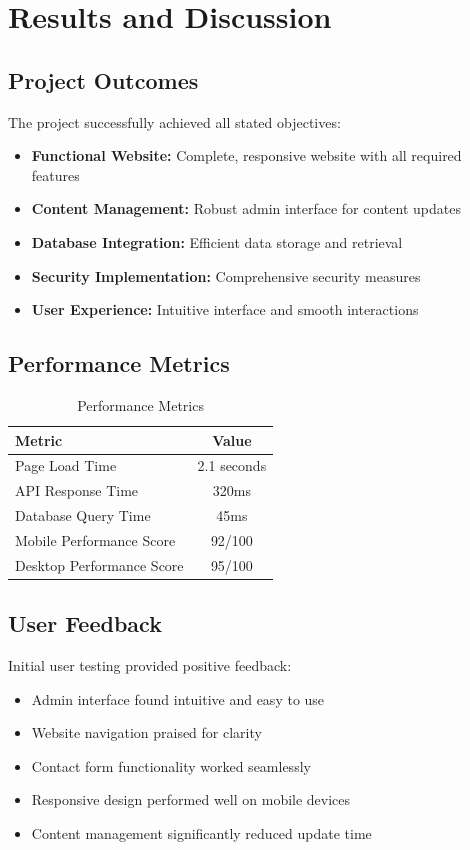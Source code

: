 \documentclass[12pt,a4paper]{report}
\begin{document}
\chapter{Results and Discussion}
\label{chap:results}

\section{Project Outcomes}
The project successfully achieved all stated objectives:
\begin{itemize}
    \item \textbf{Functional Website:} Complete, responsive website with all required features
    \item \textbf{Content Management:} Robust admin interface for content updates
    \item \textbf{Database Integration:} Efficient data storage and retrieval
    \item \textbf{Security Implementation:} Comprehensive security measures
    \item \textbf{User Experience:} Intuitive interface and smooth interactions
\end{itemize}

\section{Performance Metrics}
\begin{table}[h]
    \centering
    \begin{tabular}{|l|c|}
        \hline
        \textbf{Metric} & \textbf{Value} \\
        \hline
        Page Load Time & 2.1 seconds \\
        API Response Time & 320ms \\
        Database Query Time & 45ms \\
        Mobile Performance Score & 92/100 \\
        Desktop Performance Score & 95/100 \\
        \hline
    \end{tabular}
    \caption{Performance Metrics}
    \label{tab:performance}
\end{table}

\section{User Feedback}
Initial user testing provided positive feedback:
\begin{itemize}
    \item Admin interface found intuitive and easy to use
    \item Website navigation praised for clarity
    \item Contact form functionality worked seamlessly
    \item Responsive design performed well on mobile devices
    \item Content management significantly reduced update time
\end{itemize}
\end{document}
